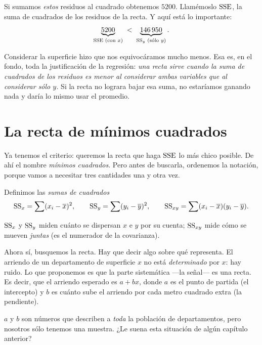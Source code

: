Si sumamos \emph{estos} residuos al cuadrado obtenemos \(\num{5200}\). Llamémoslo \(\mathrm{SSE}\), la suma de cuadrados de los residuos de la recta. Y aquí está lo importante:
\[\underbrace{\num{5200}}_{\mathrm{SSE}\text{ (con }x\text{)}} \;<\; \underbrace{\num{146950}}_{\mathrm{SS}_{y}\text{ (sólo }y\text{)}}.\]

Considerar la superficie hizo que nos equivocáramos mucho menos. Esa es, en el fondo, toda la justificación de la regresión: \emph{una recta sirve cuando la suma de cuadrados de los residuos es menor al considerar ambas variables que al considerar sólo \(y\).} Si la recta no lograra bajar esa suma, no estaríamos ganando nada y daría lo mismo usar el promedio.

\section{La recta de mínimos cuadrados}

Ya tenemos el criterio: queremos la recta que haga \(\mathrm{SSE}\) lo más chico posible. De ahí el nombre \emph{mínimos cuadrados}. Pero antes de buscarla, ordenemos la notación, porque vamos a necesitar tres cantidades una y otra vez.

\formal
Definimos las \emph{sumas de cuadrados}
\[\mathrm{SS}_{x} = \sum (x_i-\overline{x})^2, \qquad \mathrm{SS}_{y} = \sum (y_i-\overline{y})^2, \qquad \mathrm{SS}_{xy} = \sum (x_i-\overline{x})(y_i-\overline{y}).\]
\informal

\(\mathrm{SS}_{x}\) y \(\mathrm{SS}_{y}\) miden cuánto se dispersan \(x\) e \(y\) por su cuenta; \(\mathrm{SS}_{xy}\) mide cómo se mueven \emph{juntas} (es el numerador de la covarianza).


Ahora sí, busquemos la recta. Hay que decir algo sobre qué representa. El arriendo de un departamento de superficie \(x\) no está \emph{determinado} por \(x\): hay ruido. Lo que proponemos es que la parte sistemática —la señal— es una recta. Es decir, que el arriendo esperado es \(a + b x\), donde \(a\) es el punto de partida (el intercepto) y \(b\) es cuánto sube el arriendo por cada metro cuadrado extra (la pendiente).

\begin{pausa}
\(a\) y \(b\) son números que describen a \emph{toda} la población de departamentos, pero nosotros sólo tenemos una muestra. ¿Le suena esta situación de algún capítulo anterior?
\end{pausa}

